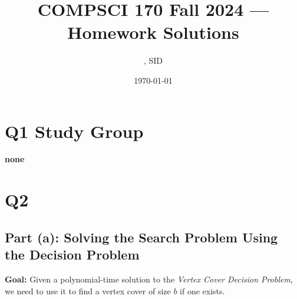 \documentclass[11pt]{article}
\title{COMPSCI 170 Fall 2024 --- Homework \Homework Solutions}
\author{\Name, SID \SID}
\date{\today}
\begin{document}
\maketitle

\section*{Q1 Study Group}

\textbf{none}

\newpage


\section*{Q2}
\subsection*{Part (a): Solving the Search Problem Using the Decision Problem}
\textbf{Goal:} Given a polynomial-time solution to the \textit{Vertex Cover Decision Problem}, we need to use it to find a vertex cover of size \( b \) if one exists.
\end{document}

